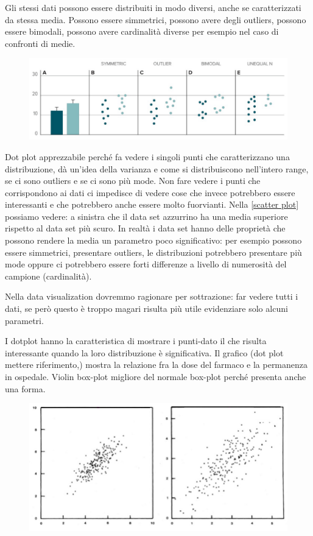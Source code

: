 \documentclass[12pt,a4paper]{report}
\begin{document}
Gli stessi dati possono essere distribuiti in modo diversi, anche se caratterizzati da stessa media. Possono essere simmetrici, possono avere degli outliers, possono essere bimodali, possono avere cardinalità diverse per esempio nel caso di confronti di medie. 


\begin{figure}[h]
	\centering
	\includegraphics[width=.5\textwidth]{imgs datavis/media.png}\hfil
	
	\caption{}\label{}
\end{figure}


Dot plot apprezzabile perché fa vedere i singoli punti che caratterizzano una distribuzione, dà un'idea della varianza e come si distribuiscono nell'intero range, se ci sono outliers e se ci sono più mode. Non fare vedere i punti che corrispondono ai dati ci impedisce di vedere cose che invece potrebbero essere interessanti e che potrebbero anche essere molto fuorvianti. Nella \ref{scatter plot} possiamo vedere: a sinistra che il data set azzurrino ha una media superiore rispetto al data set più scuro. In realtà i data set hanno delle proprietà che possono rendere la media un parametro poco significativo: per esempio possono essere simmetrici, presentare outliers, le distribuzioni potrebbero presentare più mode oppure ci potrebbero essere forti differenze a livello di numerosità del campione (cardinalità). 

Nella data visualization dovremmo ragionare per sottrazione: far vedere tutti i dati, se però questo è troppo magari risulta più utile evidenziare solo alcuni parametri. 

I dotplot hanno la caratteristica di mostrare i punti-dato il che risulta interessante quando la loro distribuzione è significativa. Il grafico (dot plot mettere riferimento,) mostra la relazione fra la dose del farmaco e la permanenza in ospedale. Violin box-plot migliore del normale box-plot perché presenta anche una forma.


 \begin{figure}[h]
 	\centering
 	\includegraphics[width=.5\textwidth]{imgs datavis/double scatter.png}\hfil
 	
 	\caption{}\label{}
 \end{figure}
\end{document}
